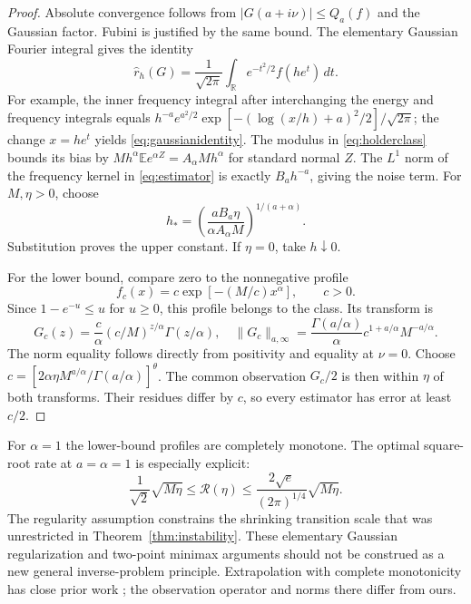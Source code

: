 \begin{proof}
Absolute convergence follows from $|G(a+i\nu)|\le Q_a(f)$ and the
Gaussian factor. Fubini is justified by the same bound. The elementary
Gaussian Fourier integral gives the identity
\begin{equation}\label{eq:gaussianidentity}
 \widehat r_h(G)=\frac1{\sqrt{2\pi}}\int_{\mathbb R}
 e^{-t^2/2}f(he^t)\,dt.
\end{equation}
For example, the inner frequency integral after interchanging the
energy and frequency integrals equals
$h^{-a}e^{a^2/2}\exp[-(\log(x/h)+a)^2/2]/\sqrt{2\pi}$;
the change $x=he^t$ yields \eqref{eq:gaussianidentity}.
The modulus in \eqref{eq:holderclass} bounds its bias by
$Mh^\alpha\mathbb E e^{\alpha Z}=A_\alpha Mh^\alpha$ for standard
normal $Z$. The $L^1$ norm of the frequency kernel in
\eqref{eq:estimator} is exactly $B_ah^{-a}$, giving the noise term.
For $M,\eta>0$, choose
\[
 h_* = \left(\frac{aB_a\eta}{\alpha A_\alpha M}\right)^{1/(a+\alpha)}.
\]
Substitution proves the upper constant. If $\eta=0$, take $h\downarrow0$.

For the lower bound, compare zero to the nonnegative profile
\[
 f_c(x)=c\exp[-(M/c)x^\alpha],\qquad c>0.
\]
Since $1-e^{-u}\le u$ for $u\ge0$, this profile belongs to the class.
Its transform is
\[
 G_c(z)=\frac{c}{\alpha}(c/M)^{z/\alpha}\Gamma(z/\alpha),
 \quad
 \|G_c\|_{a,\infty}=\frac{\Gamma(a/\alpha)}{\alpha}
 c^{1+a/\alpha}M^{-a/\alpha}.
\]
The norm equality follows directly from positivity and equality at
$\nu=0$. Choose
$c=[2\alpha\eta M^{a/\alpha}/\Gamma(a/\alpha)]^\theta$.
The common observation $G_c/2$ is then within $\eta$ of both transforms.
Their residues differ by $c$, so every estimator has error at least $c/2$.
\end{proof}

For $\alpha=1$ the lower-bound profiles are completely monotone.
The optimal square-root rate at $a=\alpha=1$ is especially explicit:
\begin{equation}\label{eq:sqrtrate}
 \frac1{\sqrt2}\sqrt{M\eta}\le\mathcal R(\eta)
 \le \frac{2\sqrt e}{(2\pi)^{1/4}}\sqrt{M\eta}.
\end{equation}
The regularity assumption constrains the shrinking transition scale
that was unrestricted in Theorem~\ref{thm:instability}.
These elementary Gaussian regularization and two-point minimax
arguments should not be construed as a new general inverse-problem
principle. Extrapolation with complete monotonicity has close prior work
\cite{brown}; the observation operator and norms there differ from ours.


